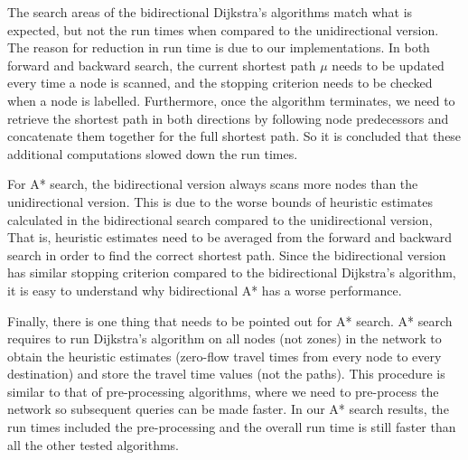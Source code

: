 The search areas of the bidirectional Dijkstra's algorithms match what is expected,
but not the run times when compared to the unidirectional version.
The reason for reduction in run time is due to our implementations.
In both forward and backward search,
the current shortest path $\mu$ needs to be updated every time a node is scanned,
and the stopping criterion needs to be checked when a node is labelled.
Furthermore,
once the algorithm terminates,
we need to retrieve the shortest path in both directions by following node predecessors and concatenate them together for the full shortest path.
So it is concluded that these additional computations slowed down the run times.

For A* search,
the bidirectional version always scans more nodes than the unidirectional version.
This is due to the worse bounds of heuristic estimates calculated in the bidirectional search compared to the unidirectional version,
That is, heuristic estimates need to be averaged from the forward and backward search in order to find the correct shortest path.
Since the bidirectional version has similar stopping criterion compared to the bidirectional Dijkstra's algorithm,
it is easy to understand why bidirectional A* has a worse performance.

Finally, there is one thing that needs to be pointed out for A* search.
A* search requires to run Dijkstra's algorithm on all nodes (not zones) in the network to obtain the heuristic estimates (zero-flow travel times from every node to every destination) and store the travel time values (not the paths).
This procedure is similar to that of pre-processing algorithms,
where we need to pre-process the network so subsequent queries can be made faster.
In our A* search results, the run times included the pre-processing and the overall run time is still faster than all the other tested algorithms.

